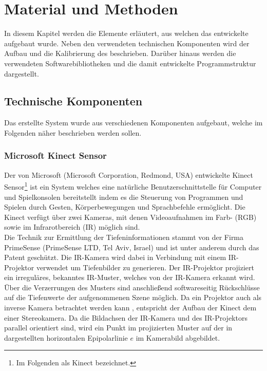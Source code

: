 \chapter{Material und Methoden}
\label{chap:material}
%
In diesem Kapitel werden die Elemente erläutert, aus welchen das entwickelte \kps{} aufgebaut wurde. Neben den verwendeten technischen Komponenten wird der Aufbau und die Kalibrierung des  beschrieben. Darüber hinaus werden die verwendeten Softwarebibliotheken und die damit entwickelte Programmstruktur dargestellt.

\section{Technische Komponenten}
Das erstellte System wurde aus verschiedenen Komponenten aufgebaut, welche im Folgenden näher beschrieben werden sollen. 

\subsection{Microsoft Kinect\textsuperscript{\texttrademark} Sensor}
\label{chap.kinect}
Der von Microsoft (Microsoft Corporation, Redmond, USA) entwickelte Kinect\textsuperscript{\texttrademark} Sensor\footnote{Im Folgenden als Kinect bezeichnet.} ist ein System welches eine natürliche Benutzerschnittstelle für Computer und Spielkonsolen bereitstellt indem es die Steuerung von Programmen und Spielen durch Gesten, Körperbewegungen und Sprachbefehle ermöglicht. Die Kinect verfügt über zwei Kameras, mit denen Videoaufnahmen im Farb- (RGB) sowie im Infrarotbereich (IR) möglich sind.\\
Die Technik zur Ermittlung der Tiefeninformationen stammt von der Firma PrimeSense (PrimeSense LTD, Tel Aviv, Israel) und ist unter anderem durch das Patent \cite{Freedman2008} geschützt. Die IR-Kamera wird dabei in Verbindung mit einem IR-Projektor verwendet um Tiefenbilder zu generieren. Der IR-Projektor projiziert ein irreguläres, bekanntes IR-Muster, welches von der IR-Kamera erkannt wird. Über die Verzerrungen des Musters sind anschließend softwareseitig Rückschlüsse auf die Tiefenwerte der aufgenommenen Szene möglich. Da ein Projektor auch als inverse Kamera betrachtet werden kann \cite{Kimura2007}, entspricht der Aufbau der Kinect dem einer Stereokamera. Da die Bildachsen der IR-Kamera und des IR-Projektors parallel orientiert sind, wird ein Punkt im projizierten Muster auf der in  dargestellten horizontalen Epipolarlinie $e$ im Kamerabild abgebildet. 

